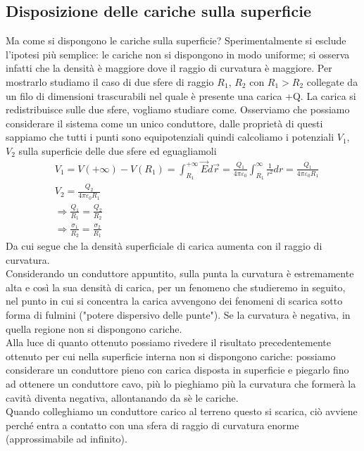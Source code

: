 \documentclass[10pt,a4paper]{article}
\begin{document}
\subsection{Disposizione delle cariche sulla superficie}
Ma come si dispongono le cariche sulla superficie? Sperimentalmente si esclude l'ipotesi più semplice: le cariche non si dispongono in modo uniforme; si osserva infatti che la densità è maggiore dove il raggio di curvatura è maggiore. Per mostrarlo studiamo il caso di due sfere di raggio \(R_1\), \(R_2\) con \(R_1>R_2\) collegate da un filo di dimensioni trascurabili nel quale è presente una carica +Q. La carica si redistribuisce sulle due sfere, vogliamo studiare come. Osserviamo che possiamo considerare il sistema come un unico conduttore, dalle proprietà di questi sappiamo che tutti i punti sono equipotenziali quindi calcoliamo i potenziali \(V_1\), \(V_2\) sulla superficie delle due sfere ed eguagliamoli
\begin{align*}
	&V_1 = V(+\infty) - V(R_1) = \int_{R_1}^{+\infty} \vec{E}d\vec{r} =  \frac{Q_1}{4\pi\varepsilon_0}\int_{R_1}^{\infty}\frac{1}{r^2}dr = \frac{Q_1}{4\pi\varepsilon_0R_1} \\
	&V_2 = \frac{Q_2}{4\pi\varepsilon_0R_1}\\
	&\Rightarrow \frac{Q_1}{R_1}= \frac{Q_2}{R_2}\\
	&\Rightarrow \frac{\sigma_1}{R_2} = \frac{\sigma_2}{R_1}
\end{align*}
Da cui segue che la densità superficiale di carica aumenta con il raggio di curvatura.\\
Considerando un conduttore appuntito, sulla punta la curvatura è estremamente alta e così la sua densità di carica, per un fenomeno che studieremo in seguito, nel punto in cui si concentra la carica avvengono dei fenomeni di scarica sotto forma di fulmini ("potere dispersivo delle punte"). Se la curvatura è negativa, in quella regione non si dispongono cariche.\\
Alla luce di quanto ottenuto possiamo rivedere il risultato precedentemente ottenuto per cui nella superficie interna non si dispongono cariche: possiamo considerare un conduttore pieno con carica disposta in superficie e piegarlo fino ad ottenere un conduttore cavo, più lo pieghiamo più la curvatura che formerà la cavità diventa negativa, allontanando da sè le cariche.\\
Quando colleghiamo un conduttore carico al terreno questo si scarica, ciò avviene perché entra a contatto con una sfera di raggio di curvatura enorme (approssimabile ad infinito). 
\end{document}
